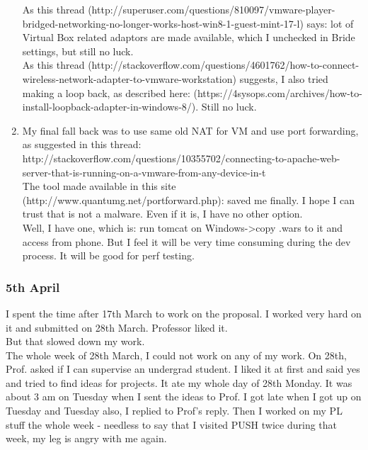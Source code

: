 \documentclass[11pt]{article}
\begin{document}
\begin{enumerate}
As this thread (http://superuser.com/questions/810097/vmware-player-bridged-networking-no-longer-works-host-win8-1-guest-mint-17-l) says: lot of 
Virtual Box related adaptors are made available, which I unchecked in Bride settings, but still no luck.\\

As this thread (http://stackoverflow.com/questions/4601762/how-to-connect-wireless-network-adapter-to-vmware-workstation) suggests, I also tried 
making a loop back, as described here: (https://4sysops.com/archives/how-to-install-loopback-adapter-in-windows-8/). Still no luck.

\item My final fall back was to use same old NAT for VM and use port forwarding, as suggested in this thread: 
http://stackoverflow.com/questions/10355702/connecting-to-apache-web-server-that-is-running-on-a-vmware-from-any-device-in-t\\
The tool made available in this site (http://www.quantumg.net/portforward.php): saved me finally. I hope I can trust that is not a malware. Even if it 
is, I have no other option. \\

Well, I have one, which is: run tomcat on Windows->copy .wars to it and access from phone. But I feel it will be very time consuming during the dev 
process. It will be good for perf testing.

\end{enumerate}

\subsubsection*{5th April}
I spent the time after 17th March to work on the proposal. I worked very hard on it and submitted on 28th March. Professor liked it. \\
But that slowed down my work.\\

The whole week of 28th March, I could not work on any of my work. On 28th, Prof. asked if I can supervise an undergrad student. I liked it at first 
and said yes and tried to find ideas for projects. It ate my whole day of 28th Monday. It was about 3 am on Tuesday when I sent the ideas to Prof. I 
got late when I got up on Tuesday and Tuesday also, I replied to Prof's reply. Then I worked on my PL stuff the whole week - needless to say that I 
visited PUSH twice during that week, my leg is angry with me again.\\
\end{document}
